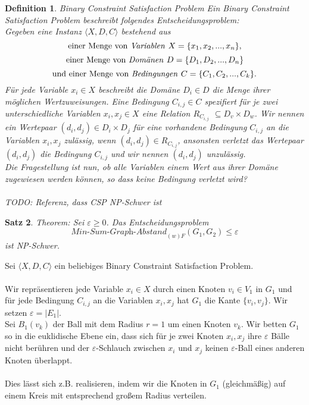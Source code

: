 \documentclass[a4paper, 12pt, twoside]{article}
\theoremstyle{Format1} %
\newtheorem{Def}{Definition}[section]       %
\newtheorem{Satz}[Def]{Satz}                %
\begin{document}
\begin{Def}
	Binary Constraint Satisfaction Problem
	Ein \textit{Binary Constraint Satisfaction Problem} beschreibt folgendes Entscheidungsproblem:
	\\
	Gegeben eine Instanz $\langle X,D,C \rangle$ bestehend aus
	$$ \text{einer Menge von \textit{Variablen }}X = \{x_1, x_2, ..., x_n\},$$
	$$ \text{einer Menge von \textit{Domänen }}D = \{D_1, D_2, ..., D_n\} $$
	$$ \text{und einer Menge von \textit{Bedingungen }}C = \{C_1, C_2, ..., C_k\}. $$
	Für jede Variable $ x_i \in X$ beschreibt die Domäne $ D_i \in D$ die Menge ihrer möglichen Wertzuweisungen.
	Eine Bedingung $C_{i,j} \in C$ spezifiert für je zwei unterschiedliche Variablen $x_i, x_j \in X$ eine Relation $R_{C_{i,j}}$ $\subseteq D_v \times D_w$.
	Wir nennen ein Wertepaar $(d_i, d_j) \in D_i \times D_j$ für eine vorhandene Bedingung $C_{i,j}$ an die Variablen $x_i,x_j$ \textit{zulässig}, wenn $(d_i,d_j) \in R_{C_{i,j}}$,
	ansonsten \textit{verletzt} das Wertepaar $(d_i, d_j)$ die Bedingung $C_{i,j}$ und wir nennen $(d_i,d_j)$ \textit{unzulässig}.
	\\
	Die Fragestellung ist nun, ob alle Variablen einem Wert aus ihrer Domäne zugewiesen werden können, so dass keine Bedingung verletzt wird?
	\\
	\\
	TODO: Referenz, dass CSP NP-Schwer ist
\end{Def}

\begin{Satz}
	Theorem: Sei $\varepsilon \geq 0$. Das Entscheidungsproblem $$ \textit{Min-Sum-Graph-Abstand}_{(w)F}(G_1, G_2) \leq  \varepsilon $$ ist NP-Schwer.
\end{Satz}

Sei $\langle X,D,C \rangle$ ein beliebiges Binary Constraint Satisfaction Problem.
\\
\\
Wir repräsentieren jede Variable $x_i \in X$ durch einen Knoten $v_i \in V_1$ in $G_1$ und für jede Bedingung $C_{i,j}$ an die Variablen $x_i, x_j$
hat $G_1$ die Kante $\{v_i, v_j\}$. Wir setzen $\varepsilon = |E_1|$.
\\
Sei $B_1(v_k)$ der Ball mit dem Radius $r=1$ um einen Knoten $v_k$.
Wir betten $G_1$ so in die euklidische Ebene ein, dass sich für je zwei Knoten $x_i,x_j$ ihre $\varepsilon$ Bälle nicht berühren und
der $\varepsilon$-Schlauch zwischen $x_i$ und $x_j$ keinen $\varepsilon$-Ball eines anderen Knoten überlappt.
\\
\\
Dies lässt sich z.B. realisieren, indem wir die Knoten in $G_1$ (gleichmäßig) auf einem Kreis mit entsprechend großem Radius verteilen.
\end{document}
